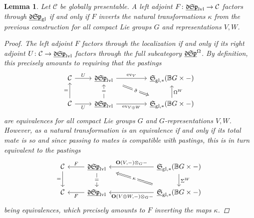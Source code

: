 \documentclass[reqno]{memo-l}
\theoremstyle{mythm}
\newtheorem{lemma}[thm]{Lemma}
\theoremstyle{definition}
\numberwithin{equation}{section}
\newcommand{\Cc}{{\mathcal{C}}}
\newcommand{\gl}{\textup{gl}}
\DeclareMathOperator{\ev}{ev}
\newcommand{\cat}[1]{\textbf{\textup{#1}}}
\newcommand{\BGcat}[1]{\mathbb B{#1}}
\newcommand{\ulhelper}[2]{\underline{\setbox0=\hbox{$#1#2$}\dp0=0.4pt \box0\relax}}
\newcommand{\ul}[1]{{\mathpalette\ulhelper{#1}}\hbox{\rule[-2pt]{0pt}{0pt}}}
\newcommand{\mySp}{{\mathfrak S\kern-.5pt\mathfrak p}}
\newcommand{\myLSp}{{\mathfrak d\kern-.25pt}\mySp}
\newcommand{\ulmySplev}{\ul{\myLSp}_\textup{lvl}}
\newcommand{\myS}{{{\mathfrak S\kern-.4pt}}}
\begin{document}
\begin{lemma}\label{lemma:kappa-bousfield}
    Let $\Cc$ be globally presentable. A left adjoint $F\colon\ulmySplev\to\Cc$ factors through $\ul\myLSp_\gl$ if and only if $F$ inverts the natural transformations $\kappa$ from the previous construction for all compact Lie groups $G$ and representations $V,W$.
    \begin{proof}
        The left adjoint $F$ factors through the localization if and only if its right adjoint $U\colon\Cc\to\ulmySplev$ factors through the full subcategory $\ul\myLSp^\Omega$. By definition, this precisely amounts to requiring that the pastings
        \[
            \begin{tikzcd}
                \Cc\arrow[from=d,"="]\arrow[r, "U"]&\ulmySplev\arrow[r,"\ev_V"]\arrow[from=d,"="{description}]\arrow[dr,Rightarrow,"\tilde\sigma"{description},shorten=1em] &[2em] \ul\myS_{\gl,*}(\BGcat{G}\times-)\\
                \Cc\arrow[r, "U"']& \ulmySplev\arrow[r,"\ev_{V\oplus W}"'] & \ul\myS_{\gl,*}(\BGcat{G}\times-)\arrow[u,"\Omega^W"']
            \end{tikzcd}
        \]
        are equivalences for all compact Lie groups $G$ and $G$-representations $V,W$. However, as a natural transformation is an equivalence if and only if its total mate is so and since passing to mates is compatible with pastings, this is in turn equivalent to the pastings
        \[
            \begin{tikzcd}
                \Cc\arrow[d,"="']\arrow[from=r, "F"']&\ulmySplev\arrow[from=r,"{\cat{O}(V,-)\otimes_G{-}}"']\arrow[d,"="{description}]\arrow[from=dr,Rightarrow,"\kappa"{description},shorten=1em] &[4em] \ul\myS_{\gl,*}(\BGcat{G}\times-)\\
                \Cc\arrow[from=r, "F"]& \ulmySplev\arrow[from=r,"\;{\cat{O}(V\oplus W,-)\otimes_G{-}}"] & \ul\myS_{\gl,*}(\BGcat{G}\times-)\arrow[from=u,"\Sigma^W"]
            \end{tikzcd}
        \]
        being equivalences, which precisely amounts to $F$ inverting the maps $\kappa$.
    \end{proof}
\end{lemma}
\end{document}
